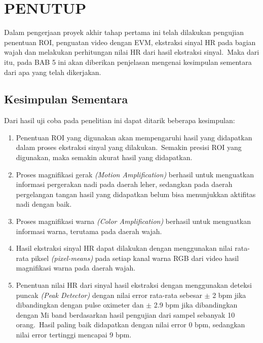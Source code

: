 \chapter{PENUTUP}

\ifpdf
    \graphicspath{{Chapter5/Figs/Raster/}{Chapter5/Figs/PDF/}{Chapter5/Figs/}}
\else
    \graphicspath{{Chapter5/Figs/Vector/}{Chapter5/Figs/}}
\fi

Dalam pengerjaan proyek akhir tahap pertama ini telah dilakukan pengujian penentuan ROI, penguatan video dengan EVM, ekstraksi sinyal HR pada bagian wajah dan melakukan perhitungan nilai HR dari hasil ekstraksi sinyal.~Maka dari itu, pada BAB 5 ini akan diberikan penjelasan mengenai kesimpulan sementara dari apa yang telah dikerjakan.

\section{Kesimpulan Sementara}
Dari hasil uji coba pada penelitian ini dapat ditarik beberapa kesimpulan:
\begin{enumerate}
\item Penentuan ROI yang digunakan akan mempengaruhi hasil yang didapatkan dalam proses ekstraksi sinyal yang dilakukan.~Semakin presisi ROI yang digunakan, maka semakin akurat hasil yang didapatkan.
\item Proses magnifikasi gerak \textit{(Motion Amplification)} berhasil untuk menguatkan informasi pergerakan nadi pada daerah leher, sedangkan pada daerah pergelangan tangan hasil yang didapatkan belum bisa menunjukkan aktifitas nadi dengan baik.
\item Proses magnifikasi warna \textit{(Color Amplification)} berhasil untuk menguatkan informasi warna, terutama pada daerah wajah.
\item Hasil ekstraksi sinyal HR dapat dilakukan dengan menggunakan nilai rata-rata piksel \textit{(pixel-means)} pada setiap kanal warna RGB dari video hasil magnifikasi warna pada daerah wajah.
\item Penentuan nilai HR dari sinyal hasil ekstraksi dengan menggunakan deteksi puncak \textit{(Peak Detector)} dengan nilai error rata-rata sebesar \(\pm\) 2 bpm jika dibandingkan dengan pulse oximeter dan \(\pm\) 2.9 bpm jika dibandingkan dengan Mi band berdasarkan hasil pengujian dari sampel sebanyak 10 orang.~Hasil paling baik didapatkan dengan nilai error 0 bpm, sedangkan nilai error tertinggi mencapai 9 bpm.
\end{enumerate}

